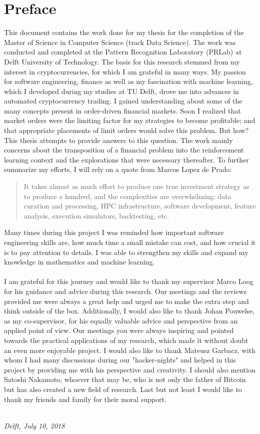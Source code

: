 \chapter*{Preface}
This document contains the work done for my thesis for the completion of the Master of Science in Computer Science (track Data Science). 
The work was conducted and completed at the Pattern Recognition Laboratory (PRLab) at Delft University of Technology.
The basis for this research stemmed from my interest in cryptocurrencies, for which I am grateful in many ways.
My passion for software engineering, finance as well as my fascination with machine learning, which I developed during my studies at TU Delft, drove me into advances in automated cryptocurrency trading.
I gained understanding about some of the many concepts present in order-driven financial markets.
Soon I realized that market orders were the limiting factor for my strategies to become profitable; and that appropriate placements of limit orders would solve this problem.
But how?
This thesis attempts to provide answers to this question.
The work mainly concerns about the transposition of a financial problem into the reinforcement learning context and the explorations that were necessary thereafter.
To further summarize my efforts, I will rely on a quote from Marcos Lopez de Prado:
\begin{quote}
    It takes almost as much effort to produce one true investment strategy as to produce a hundred, and the complexities are overwhelming: data curation and processing, HPC infrastructure, software development, feature analysis, execution simulators, backtesting, etc. \cite{de2018advances}
\end{quote}
\noindent
Many times during this project I was reminded how important software engineering skills are, how much time a small mistake can cost, and how crucial it is to pay attention to details.
I was able to strengthen my skills and expand my knowledge in mathematics and machine learning.
\\
\\
I am grateful for this journey and would like to thank my supervisor Marco Loog for his guidance and advice during this research.
Our meetings and the reviews provided me were always a great help and urged me to make the extra step and think outside of the box.
Additionally, I would also like to thank Johan Pouwelse, as my co-supervisor, for his equally valuable advice and perspective from an applied point of view.
Our meetings you were always inspiring and pointed towards the practical applications of my research, which made it without doubt an even more enjoyable project.
I would also like to thank Mateusz Garbacz, with whom I had many discussions during our "hacker-nights" and helped in this project by providing me with his perspective and creativity.
I should also mention Satoshi Nakamoto, whoever that may be, who is not only the father of Bitcoin but has also created a new field of research.
Last but not least I would like to thank my friends and family for their moral support.

\begin{flushright}
{\makeatletter\itshape
    \@author \\
    Delft, July 10, 2018
\makeatother}
\end{flushright}

